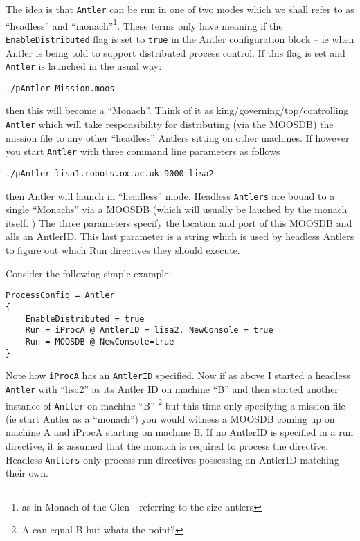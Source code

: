 \documentclass[a4paper,10pt]{article}
\newcommand{\Code}[1]{\texttt{#1} }
\newcommand{\code}[1]{\Code{#1} }
\begin{document}
The idea is that \code{Antler} can be run in one of two modes which we shall refer to as ``headless'' and ``monach''\footnote{as in Monach of the Glen - referring to the size antlers}. These terms only have meaning if the \code{EnableDistributed} flag is set to \code{true} in the Antler configuration block -- ie when Antler is being told to support distributed process control. If this flag is set and \code{Antler} is launched in the usual way:

\begin{lstlisting}
./pAntler Mission.moos
\end{lstlisting}

then this will become a ``Monach''. Think of it as king/governing/top/controlling \code{Antler} which will take responsibility for distributing (via the MOOSDB) the mission file to any other ``headless'' Antlers sitting on other machines.  If however you start \code{Antler} with three command line parameters as follows

\begin{lstlisting}
./pAntler lisa1.robots.ox.ac.uk 9000 lisa2
\end{lstlisting}

then Antler will launch in ``headless'' mode. Headless \code{Antlers} are bound to a single ``Monachs'' via a MOOSDB (which will usually be lauched by the monach itself. ) The three parameters specify the location and port of this MOOSDB and alls an AntlerID. This last parameter is a string which is used by headless Antlers to figure out which Run directives they should execute.

Consider the following simple example:

\begin{lstlisting}
ProcessConfig = Antler
{
	EnableDistributed = true
	Run = iProcA @ AntlerID = lisa2, NewConsole = true	
	Run = MOOSDB @ NewConsole=true
}
\end{lstlisting}

Note how \code{iProcA} has an \code{AntlerID} specified. Now if as above I started a headless \code{Antler} with ``lisa2'' as its Antler ID on machine ``B'' and then started another instance of \code{Antler}  on machine ``B'' \footnote{ A can equal B but whats the point?} but this time only specifying a mission file (ie start Antler as a ``monach'') you would witness a MOOSDB coming up on machine A and iProcA
starting on machine B. If no AntlerID is specified in a run directive, it is assumed that the monach is required to  process the directive. Headless \code{Antlers} only process run directives possessing an AntlerID matching their own.
\end{document}
